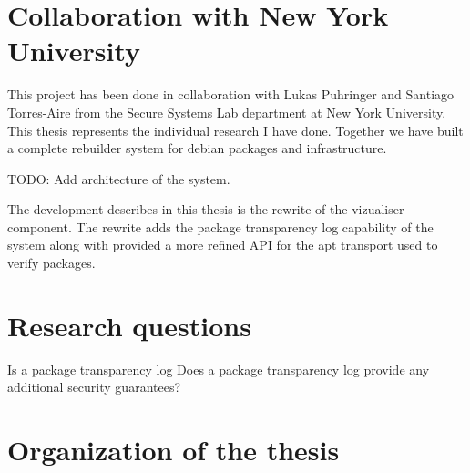 \documentclass[../Main/thesis.tex]{subfiles}
\begin{document}
\section{Collaboration with New York University}\label{sec:collab}
This project has been done in collaboration with Lukas Puhringer and Santiago
Torres-Aire from the Secure Systems Lab department at New York University. This
thesis represents the individual research I have done. Together we have built a
complete rebuilder system for debian packages and infrastructure. 

TODO: Add architecture of the system.

The development describes in this thesis is the rewrite of the vizualiser
component. The rewrite adds the package transparency log capability of the
system along with provided a more refined API for the apt transport used to
verify packages.

\section{Research questions}\label{sec:rq}

Is a package transparency log 
Does a package transparency log provide any additional security guarantees?


\section{Organization of the thesis}\label{sec:organization}

\blankpage
\end{document}
